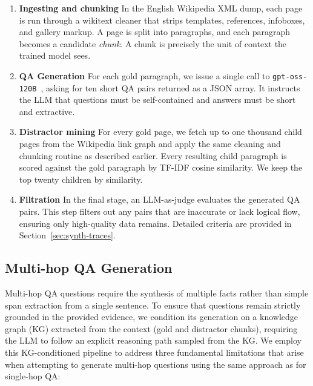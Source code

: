 \begin{enumerate}
    \item \textbf{Ingesting and chunking} \hspace{0.5em} In the English Wikipedia XML dump, each page is run through a wikitext cleaner that strips templates, references, infoboxes, and gallery markup. A page is split into paragraphs, and each paragraph becomes a candidate \textit{chunk}. A chunk is precisely the unit of context the trained model sees.
    \item \textbf{QA Generation} \hspace{0.5em} For each gold paragraph, we issue a single call to \texttt{gpt-oss-120B}~\citep{openai2025gptoss120bgptoss20bmodel}, asking for ten short QA pairs returned as a JSON array. It instructs the LLM that questions must be self-contained and answers must be short and extractive.
    \item \textbf{Distractor mining} \hspace{0.5em} For every gold page, we fetch up to one thousand child pages from the Wikipedia link graph and apply the same cleaning and chunking routine as described earlier. Every resulting child paragraph is scored against the gold paragraph by TF-IDF cosine similarity. We keep the top twenty children by similarity.
    \item \textbf{Filtration} \hspace{0.5em} In the final stage, an LLM-as-judge evaluates the generated QA pairs. This step filters out any pairs that are inaccurate or lack logical flow, ensuring only high-quality data remains. Detailed criteria are provided in Section~\ref{sec:synth-traces}.
\end{enumerate}

\subsection{Multi-hop QA Generation}
\label{sec:synth-multihop}

Multi-hop QA questions require the synthesis of multiple facts rather than simple span extraction from a single sentence. To ensure that questions remain strictly grounded in the provided evidence, we condition its generation on a knowledge graph (KG) extracted from the context (gold and distractor chunks), requiring the LLM to follow an explicit reasoning path sampled from the KG. We employ this KG-conditioned pipeline to address three fundamental limitations that arise when attempting to generate multi-hop questions using the same approach as for single-hop QA:

